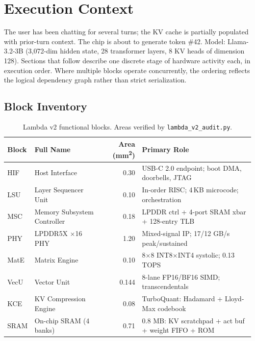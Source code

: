 \documentclass[11pt,letterpaper]{article}
\begin{document}
\newpage

\tableofcontents
\newpage

\section{Execution Context}

The user has been chatting for several turns; the KV cache is partially populated with
prior-turn context. The chip is about to generate token \#42. Model: Llama-3.2-3B
(3{,}072-dim hidden state, 28 transformer layers, 8 KV heads of dimension 128). Sections that
follow describe one discrete stage of hardware activity each, in execution order. Where
multiple blocks operate concurrently, the ordering reflects the logical dependency graph
rather than strict serialization.

\subsection{Block Inventory}

\begin{table}[h!]
\centering
\small
\begin{tabular}{@{}l l r l@{}}
\toprule
\textbf{Block} & \textbf{Full Name} & \textbf{Area (mm\textsuperscript{2})} & \textbf{Primary Role} \\
\midrule
HIF  & Host Interface              & 0.30  & USB-C 2.0 endpoint; boot DMA, doorbells, JTAG \\
LSU  & Layer Sequencer Unit        & 0.10  & In-order RISC; 4\,KB microcode; orchestration \\
MSC  & Memory Subsystem Controller & 0.18  & LPDDR ctrl + 4-port SRAM xbar + 128-entry TLB \\
PHY  & LPDDR5X $\times$16 PHY      & 1.20  & Mixed-signal IP; 17/12 GB/s peak/sustained \\
MatE & Matrix Engine               & 0.10  & 8$\times$8 INT8$\times$INT4 systolic; 0.13 TOPS \\
VecU & Vector Unit                 & 0.144 & 8-lane FP16/BF16 SIMD; transcendentals \\
KCE  & KV Compression Engine       & 0.08  & TurboQuant: Hadamard + Lloyd-Max codebook \\
SRAM & On-chip SRAM (4 banks)      & 0.71  & 0.8 MB: KV scratchpad + act buf + weight FIFO + ROM \\
\bottomrule
\end{tabular}
\caption{Lambda v2 functional blocks. Areas verified by \texttt{lambda\_v2\_audit.py}.}
\end{table}
\end{document}
